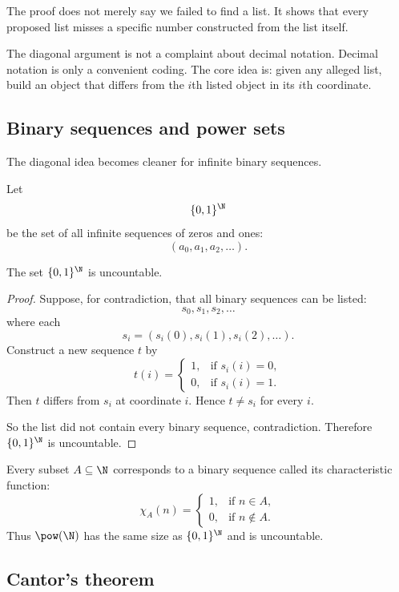 The proof does not merely say we failed to find a list. It shows that every proposed list misses a specific number constructed from the list itself.

\begin{trapbox}
The diagonal argument is not a complaint about decimal notation. Decimal notation is only a convenient coding. The core idea is: given any alleged list, build an object that differs from the $i$th listed object in its $i$th coordinate.
\end{trapbox}

\subsection{Binary sequences and power sets}

The diagonal idea becomes cleaner for infinite binary sequences.

Let
\[
\{0,1\}^{\N}
\]
be the set of all infinite sequences of zeros and ones:
\[
(a_0,a_1,a_2,\ldots).
\]

\begin{theorem}
The set $\{0,1\}^{\N}$ is uncountable.
\end{theorem}

\begin{proof}
Suppose, for contradiction, that all binary sequences can be listed:
\[
s_0,s_1,s_2,\ldots
\]
where each
\[
s_i=(s_i(0),s_i(1),s_i(2),\ldots).
\]
Construct a new sequence $t$ by
\[
t(i)=
\begin{cases}
1,&\text{if }s_i(i)=0,\\
0,&\text{if }s_i(i)=1.
\end{cases}
\]
Then $t$ differs from $s_i$ at coordinate $i$. Hence $t\neq s_i$ for every $i$.

So the list did not contain every binary sequence, contradiction. Therefore $\{0,1\}^{\N}$ is uncountable.
\end{proof}

Every subset $A\subseteq\N$ corresponds to a binary sequence called its characteristic function:
\[
\chi_A(n)=
\begin{cases}
1,&\text{if }n\in A,\\
0,&\text{if }n\notin A.
\end{cases}
\]
Thus $\pow(\N)$ has the same size as $\{0,1\}^{\N}$ and is uncountable.

\subsection{Cantor's theorem}

